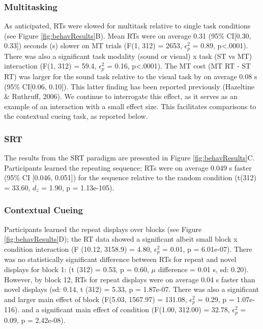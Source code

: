 \documentclass[
  man]{apa6}
\begin{document}
\hypertarget{multitasking-1}{%
\subsubsection{Multitasking}\label{multitasking-1}}

As anticipated, RTs were slowed for multitask relative to single task conditions (see Figure \ref{fig:behavResults}B). Mean RTs were on average 0.31 (95\% CI{[}0.30, 0.33{]}) seconds (s) slower on MT trials (F(1, 312) = 2653, \(\epsilon_{p}^2\) = 0.89, p\textless.0001). There was also a significant task modality (sound or visual) x task (ST vs MT) interaction (F(1, 312) = 59.4, \(\epsilon_{p}^2\) = 0.16, p\textless.0001). The MT cost (MT RT - ST RT) was larger for the sound task relative to the visual task by on average 0.08 s (95\% CI{[}0.06, 0.10{]}). This latter finding has been reported previously (Hazeltine \& Ruthruff, 2006). We continue to interrogate this effect, as it serves as an example of an interaction with a small effect size. This facilitates comparisons to the contextual cueing task, as reported below.

\hypertarget{srt}{%
\subsubsection{SRT}\label{srt}}

The results from the SRT paradigm are presented in Figure \ref{fig:behavResults}C. Participants learned the repeating sequence; RTs were on average 0.049 s faster (95\% CI {[}0.046, 0.051{]}) for the sequence relative to the random condition (t(312) = 33.60, \(d_z\) = 1.90, p = 1.13e-105).

\hypertarget{contextual-cueing-1}{%
\subsubsection{Contextual Cueing}\label{contextual-cueing-1}}

\label{sec:CCRes}

Participants learned the repeat displays over blocks (see Figure \ref{fig:behavResults}D); the RT data showed a significant albeit small block x condition interaction (F (10.12, 3158.9) = 4.80, \(\epsilon_{p}^2\) = 0.01, p = 6.01e-07). There was no statistically significant difference between RTs for repeat and novel displays for block 1: (t (312) = 0.53, p = 0.60, \(\mu\) difference = 0.01 s, sd: 0.20). However, by block 12, RTs for repeat displays were on average 0.04 s faster than novel displays (sd: 0.14, t (312) = 5.33, p = 1.87e-07. There was also a significant and larger main effect of block (F(5.03, 1567.97) = 131.08, \(\epsilon_{p}^2\) = 0.29, p = 1.07e-116). and a significant main effect of condition (F(1.00, 312.00) = 32.78, \(\epsilon_{p}^2\) = 0.09, p = 2.42e-08).
\end{document}
